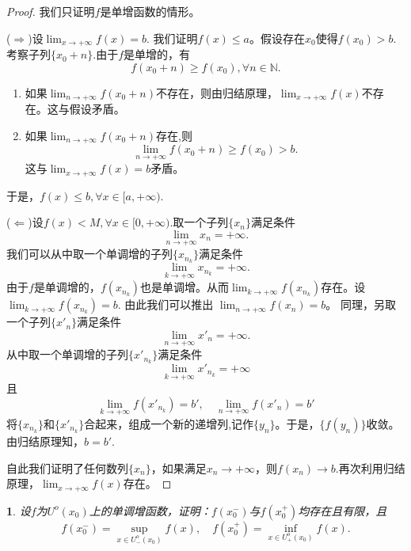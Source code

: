 \documentclass[utf8]{book}
\newtheorem{example}{}[section]             %
\begin{document}
\begin{proof}我们只证明$f$是单增函数的情形。

($\Rightarrow$)设$\displaystyle\lim_{x\to +\infty}f(x) = b$. 我们证明$f(x) \leq a$。假设存在$x_0$使得$f(x_0) > b$. 考察子列$\{x_0+n\}$.由于$f$是单增的，有
$$f(x_0+n) \geq f(x_0), \forall n\in\mathbb{N}.$$
\renewcommand\labelenumi{\normalfont(\theenumi)}
\begin{enumerate}
\item 如果$\displaystyle\lim_{n\to +\infty}f(x_0+n)$不存在，则由归结原理，$\displaystyle\lim_{x\to +\infty}f(x)$不存在。这与假设矛盾。
\item 如果$\displaystyle\lim_{n\to +\infty}f(x_0+n)$存在,则
$$\displaystyle\lim_{n\to +\infty}f(x_0+n) \geq f(x_0) > b.$$
这与$\displaystyle\lim_{x\to +\infty}f(x)=b$矛盾。
\end{enumerate}
于是，$f(x) \leq b,\forall x\in[a,+\infty)$.

($\Leftarrow$)设$f(x) < M,\forall x\in [0, +\infty)$.取一个子列$\{x_n\}$满足条件
$$\displaystyle\lim_{n\to +\infty}x_n=+\infty.$$我们可以从中取一个单调增的子列$\{x_{n_k}\}$满足条件$$\displaystyle\lim_{k\to +\infty}x_{n_k}=+\infty.$$ 
由于$f$是单调增的，$f(x_{n_k})$也是单调增。从而$\displaystyle\lim_{k\to +\infty}f(x_{n_k})$存在。设$\displaystyle\lim_{k\to +\infty}f(x_{n_k})=b$. 由此我们可以推出
$\displaystyle\lim_{n\to +\infty}f(x_{n})=b$。
同理，另取一个子列$\{x'_n\}$满足条件
$$\displaystyle\lim_{n\to +\infty}x'_n=+\infty.$$从中取一个单调增的子列$\{x'_{n_k}\}$满足条件$$\displaystyle\lim_{k\to +\infty}x'_{n_k}=+\infty$$且 
$$\displaystyle\lim_{k\to +\infty}f(x'_{n_k})=b',\quad \displaystyle\lim_{n\to +\infty}f(x'_{n})=b'$$
将$\{x_{n_k}\}$和$\{x'_{n_k}\}$合起来，组成一个新的递增列,记作$\{y_n\}$。于是，$\{f(y_n)\}$收敛。由归结原理知，$b=b'$. 

自此我们证明了任何数列$\{x_n\}$，如果满足$x_n\rightarrow+\infty$，则$f(x_n)\rightarrow b$.再次利用归结原理，$\displaystyle\lim_{x\to +\infty}f(x)$存在。
\end{proof}
\begin{example}
设$f$为$U^o(x_0)$上的单调增函数，证明：$f(x_0^-)$与$f(x_0^+)$均存在且有限，且
$$f(x^-_0)=\displaystyle\sup_{x\in U^o_-(x_0)}f(x), \quad f(x^+_0)=\displaystyle\inf_{x\in U^o_+(x_0)}f(x).$$
\end{example}
\end{document}
